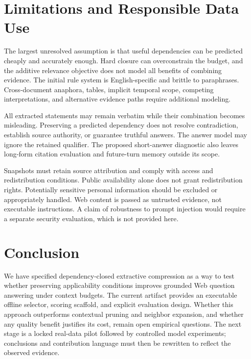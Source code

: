 \documentclass[10pt,twocolumn]{article}
\begin{document}
\section{Limitations and Responsible Data Use}
The largest unresolved assumption is that useful dependencies can be predicted cheaply and accurately enough. Hard closure can overconstrain the budget, and the additive relevance objective does not model all benefits of combining evidence. The initial rule system is English-specific and brittle to paraphrases. Cross-document anaphora, tables, implicit temporal scope, competing interpretations, and alternative evidence paths require additional modeling.

All extracted statements may remain verbatim while their combination becomes misleading. Preserving a predicted dependency does not resolve contradiction, establish source authority, or guarantee truthful answers. The answer model may ignore the retained qualifier. The proposed short-answer diagnostic also leaves long-form citation evaluation and future-turn memory outside its scope.

Snapshots must retain source attribution and comply with access and redistribution conditions. Public availability alone does not grant redistribution rights. Potentially sensitive personal information should be excluded or appropriately handled. Web content is passed as untrusted evidence, not executable instructions. A claim of robustness to prompt injection would require a separate security evaluation, which is not provided here.

\section{Conclusion}
We have specified dependency-closed extractive compression as a way to test whether preserving applicability conditions improves grounded Web question answering under context budgets. The current artifact provides an executable offline selector, scoring scaffold, and explicit evaluation design. Whether this approach outperforms contextual pruning and neighbor expansion, and whether any quality benefit justifies its cost, remain open empirical questions. The next stage is a locked real-data pilot followed by controlled model experiments; conclusions and contribution language must then be rewritten to reflect the observed evidence.
\end{document}
